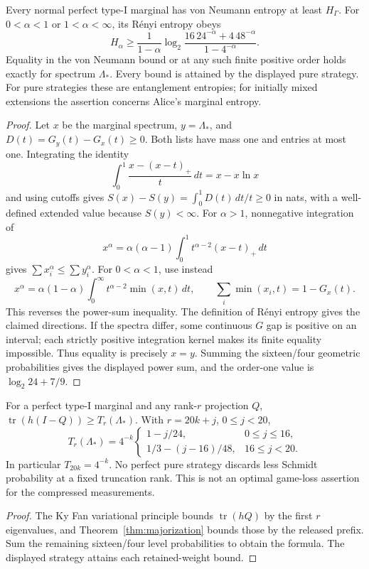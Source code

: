 \begin{theorem}\label{thm:renyi-minimum}
Every normal perfect type-I marginal has von Neumann entropy at least $H_\Gamma$. For $0<\alpha<1$ or $1<\alpha<\infty$, its R\'enyi entropy obeys
\[
 H_\alpha\ge\frac1{1-\alpha}\log_2
       \frac{16\,24^{-\alpha}+4\,48^{-\alpha}}{1-4^{-\alpha}}.
\]
Equality in the von Neumann bound or at any such finite positive order holds exactly for spectrum $\Lambda_*$. Every bound is attained by the displayed pure strategy. For pure strategies these are entanglement entropies; for initially mixed extensions the assertion concerns Alice's marginal entropy.
\end{theorem}
\begin{proof}
Let $x$ be the marginal spectrum, $y=\Lambda_*$, and $D(t)=G_y(t)-G_x(t)\ge0$. Both lists have mass one and entries at most one. Integrating the identity
\[
 \int_0^1\frac{x-(x-t)_+}{t}\,dt=x-x\ln x
\]
and using cutoffs gives $S(x)-S(y)=\int_0^1D(t)\,dt/t\ge0$ in nats, with a well-defined extended value because $S(y)<\infty$.
For $\alpha>1$, nonnegative integration of
\[
 x^\alpha=\alpha(\alpha-1)\int_0^1t^{\alpha-2}(x-t)_+\,dt
\]
gives $\sum x_i^\alpha\le\sum y_i^\alpha$. For $0<\alpha<1$, use instead
\[
 x^\alpha=\alpha(1-\alpha)\int_0^\infty
                 t^{\alpha-2}\min(x,t)\,dt,
 \qquad \sum_i\min(x_i,t)=1-G_x(t).
\]
This reverses the power-sum inequality. The definition of R\'enyi entropy gives the claimed directions. If the spectra differ, some continuous $G$ gap is positive on an interval; each strictly positive integration kernel makes its finite equality impossible. Thus equality is precisely $x=y$. Summing the sixteen/four geometric probabilities gives the displayed power sum, and the order-one value is $\log_2 24+7/9$.
\end{proof}

\begin{corollary}\label{cor:optimal-tails}
For a perfect type-I marginal and any rank-$r$ projection $Q$, $\operatorname{tr}(h(I-Q))\ge T_r(\Lambda_*)$. With $r=20k+j$, $0\le j<20$,
\[
 T_r(\Lambda_*)=4^{-k}
 \begin{cases}
 1-j/24,&0\le j\le16,\\
 1/3-(j-16)/48,&16\le j<20.
 \end{cases}
\]
In particular $T_{20k}=4^{-k}$. No perfect pure strategy discards less Schmidt probability at a fixed truncation rank. This is not an optimal game-loss assertion for the compressed measurements.
\end{corollary}
\begin{proof}
The Ky Fan variational principle bounds $\operatorname{tr}(hQ)$ by the first $r$ eigenvalues, and Theorem~\ref{thm:majorization} bounds those by the released prefix. Sum the remaining sixteen/four level probabilities to obtain the formula. The displayed strategy attains each retained-weight bound.
\end{proof}

